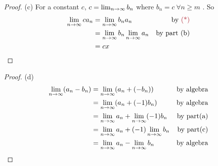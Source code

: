 \begin{proof} (c)
For a constant \(c\), \(c = \lim_{n \to \infty} b_n\) where \(b_n = c\ \forall n \ge m\) \MAROON{(*)}. So
\begin{align*}
    \lim_{n \toINF} c a_n & = \lim_{n \toINF} b_n a_n & \text{by \MAROON{(*)}} \\
                          & = \lim_{n \toINF} b_n \lim_{n \toINF} a_n & \text{by part (b)} \\
                          & = cx
\end{align*}
\end{proof}

\begin{proof} (d)
\begin{align*}
\lim_{n \to \infty}(a_n - b_n) & = \lim_{n \to \infty}(a_n + (-b_n)) & \text{by algebra} \\
                           & = \lim_{n \to \infty}(a_n + (-1) b_n) & \text{by algebra} \\
                           & = \lim_{n \to \infty} a_n + \lim_{n \to \infty}(-1) b_n & \text{by part(a)} \\
                           & = \lim_{n \to \infty} a_n + (-1)\lim_{n \to \infty} b_n & \text{by part(c)} \\
                           & = \lim_{n \to \infty} a_n - \lim_{n \to \infty} b_n & \text {by algebra}
\end{align*}
\end{proof}

